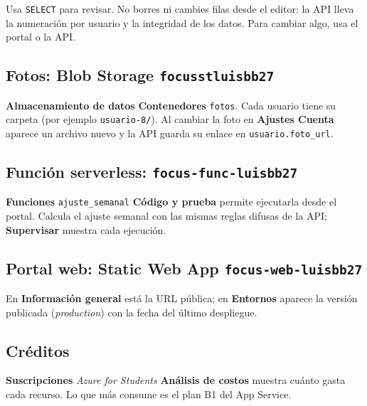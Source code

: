 \documentclass[11pt,a4paper]{article}
\newcommand{\menu}[1]{\textsf{\textbf{#1}}}
\begin{document}
\begin{alerta}
Usa \texttt{SELECT} para revisar. No borres ni cambies filas desde el editor: la API lleva la
numeración por usuario y la integridad de los datos. Para cambiar algo, usa el portal o la API.
\end{alerta}

\subsection{Fotos: Blob Storage \texttt{focusstluisbb27}}
\menu{Almacenamiento de datos} \textrightarrow{} \menu{Contenedores} \textrightarrow{} \texttt{fotos}. Cada
usuario tiene su carpeta (por ejemplo \texttt{usuario-8/}). Al cambiar la foto en
\menu{Ajustes \textrightarrow{} Cuenta} aparece un archivo nuevo y la API guarda su enlace en \texttt{usuario.foto\_url}.

\subsection{Función serverless: \texttt{focus-func-luisbb27}}
\menu{Funciones} \textrightarrow{} \texttt{ajuste\_semanal} \textrightarrow{} \menu{Código y prueba}
permite ejecutarla desde el portal. Calcula el ajuste semanal con las mismas reglas difusas de la API;
\menu{Supervisar} muestra cada ejecución.

\subsection{Portal web: Static Web App \texttt{focus-web-luisbb27}}
En \menu{Información general} está la URL pública; en \menu{Entornos} aparece la versión publicada
(\emph{production}) con la fecha del último despliegue.

\subsection{Créditos}
\menu{Suscripciones} \textrightarrow{} \emph{Azure for Students} \textrightarrow{} \menu{Análisis de costos}
muestra cuánto gasta cada recurso. Lo que más consume es el plan B1 del App Service.

\end{document}
